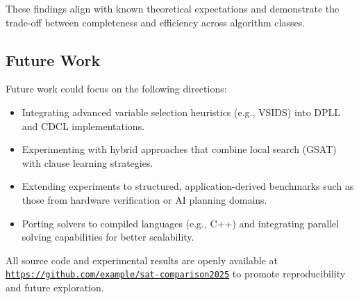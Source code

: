 \documentclass[11pt]{article}
\begin{document}
These findings align with known theoretical expectations and demonstrate the trade-off between completeness and efficiency across algorithm classes.

\subsection*{Future Work}

Future work could focus on the following directions:
\begin{itemize}
    \item Integrating advanced variable selection heuristics (e.g., VSIDS) into DPLL and CDCL implementations.
    \item Experimenting with hybrid approaches that combine local search (GSAT) with clause learning strategies.
    \item Extending experiments to structured, application-derived benchmarks such as those from hardware verification or AI planning domains.
    \item Porting solvers to compiled languages (e.g., C++) and integrating parallel solving capabilities for better scalability.
\end{itemize}

All source code and experimental results are openly available at \texttt{\url{https://github.com/example/sat-comparison2025}} to promote reproducibility and future exploration.




\end{document}
